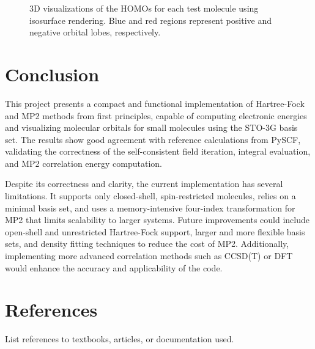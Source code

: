 \documentclass[12pt]{article}
\begin{document}
\begin{figure}[H]
    \caption{3D visualizations of the HOMOs for each test molecule using isosurface rendering. Blue and red regions represent positive and negative orbital lobes, respectively.}
\end{figure}

\section{Conclusion}

This project presents a compact and functional implementation of Hartree-Fock and MP2 methods from first principles, capable of computing electronic energies and visualizing molecular orbitals for small molecules using the STO-3G basis set. The results show good agreement with reference calculations from PySCF, validating the correctness of the self-consistent field iteration, integral evaluation, and MP2 correlation energy computation.

Despite its correctness and clarity, the current implementation has several limitations. It supports only closed-shell, spin-restricted molecules, relies on a minimal basis set, and uses a memory-intensive four-index transformation for MP2 that limits scalability to larger systems. Future improvements could include open-shell and unrestricted Hartree-Fock support, larger and more flexible basis sets, and density fitting techniques to reduce the cost of MP2. Additionally, implementing more advanced correlation methods such as CCSD(T) or DFT would enhance the accuracy and applicability of the code.

\section*{References}
List references to textbooks, articles, or documentation used.
\end{document}

